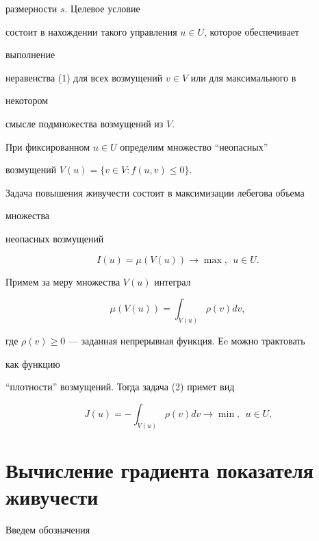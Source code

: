 размерности $s$. Целевое условие 


состоит в нахождении такого управления $u\in U$, которое обеспечивает 


выполнение 


неравенства (1) для всех возмущений $v\in V$ или для максимального в 


некотором 


смысле подмножества возмущений из $V$.





При фиксированном $u\in U$ определим множество ``неопасных''


возмущений $V(u)=\{v\in V:f(u,v)\le0\}$.


Задача повышения живучести состоит в максимизации лебегова объема 


множества 


неопасных возмущений


\begin{equation}


I(u)=\mu(V(u))\to\max,\ \ u\in U.


\end{equation}





Примем за меру множества $V(u)$ интеграл


$$


\mu(V(u))=\int_{V(u)}\rho(v)dv,


$$


где $\rho(v)\ge0$ --- заданная непрерывная функция. Еe можно трактовать 


как функцию 


``плотности'' возмущений. Тогда задача (2) примет вид


\begin{equation}


J(u)=-\int_{V(u)}\rho(v)dv\to\min,\ \ u\in U.


\end{equation}





\section{Вычисление градиента показателя живучести}





Введем обозначения


